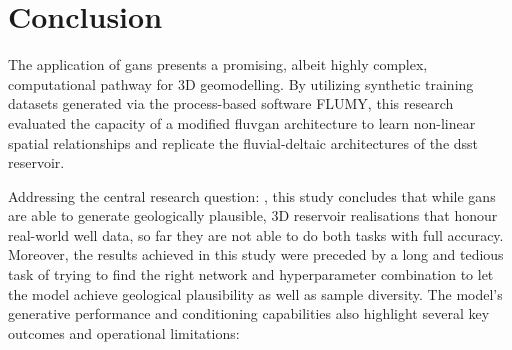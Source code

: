 \chapter{Conclusion}\label{Ch:Conclusion}
The application of \glspl{gan} presents a promising, albeit highly complex, computational pathway for 3D geomodelling. By utilizing synthetic training datasets generated via the process-based software FLUMY, this research evaluated the capacity of a modified \gls{fluvgan} architecture to learn non-linear spatial relationships and replicate the fluvial-deltaic architectures of the \gls{dsst} reservoir.  

Addressing the central research question: , this study concludes that while \glspl{gan} are able to generate geologically plausible, 3D reservoir realisations that honour real-world well data, so far they are not able to do both tasks with full accuracy. Moreover, the results achieved in this study were preceded by a long and tedious task of trying to find the right network and hyperparameter combination to let the model achieve geological plausibility as well as sample diversity. The model’s generative performance and conditioning capabilities also highlight several key outcomes and operational limitations:

